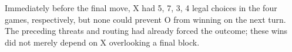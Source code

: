 Immediately before the final move, X had 5, 7, 3, 4 legal choices in the four games, respectively, but none could prevent O from winning on the next turn. The preceding threats and routing had already forced the outcome; these wins did not merely depend on X overlooking a final block.
